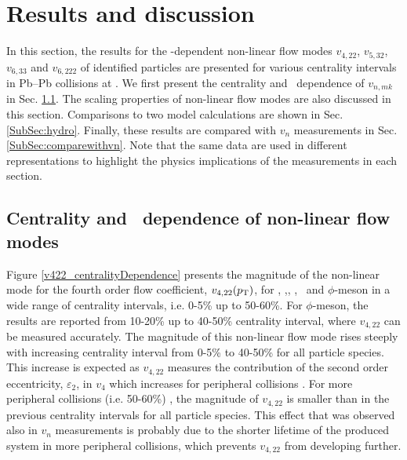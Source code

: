 \newpage

\section{Results and discussion}
\label{Sec:Results}

In this section, the results for the \pT-dependent non-linear flow modes $v_{4,22}$, $v_{5,32}$, $v_{6,33}$ and $v_{6,222}$ of identified particles are presented for various centrality intervals in Pb--Pb collisions at \sNN. We first present the centrality and \pT~dependence of $v_{n,mk}$ in Sec. \ref{SubSec:pTdependence}. The scaling properties of non-linear flow modes are also discussed in this section. Comparisons to two model calculations are shown in Sec. \ref{SubSec:hydro}. Finally, these results are compared with $v_{n}$ measurements in Sec. \ref{SubSec:comparewithvn}. Note that the same data are used in different representations to highlight the physics implications of the measurements in each section. 

\subsection{Centrality and \pT~dependence of non-linear flow modes}
\label{SubSec:pTdependence}

Figure \ref{v422_centralityDependence} presents the magnitude of the non-linear mode for the fourth order flow coefficient, $v_{4,22}(p_{\rm{T}})$, for \pion, \kaon,\Ks, \proton, \lambdas~and $\phi$-meson in a wide range of centrality intervals, i.e. 0-5\% up to 50-60\%. For $\phi$-meson, the results are reported from 10-20\% up to 40-50\% centrality interval, where $v_{4,22}$ can be measured accurately. The magnitude of this non-linear flow mode rises steeply with increasing centrality interval from 0-5\% to 40-50\% for all particle species. This increase is expected as $v_{4,22}$ measures the contribution of the second order eccentricity, $\varepsilon_{2}$, in $v_{4}$ which increases for peripheral collisions \cite{Alver:2010gr, Acharya:2017zfg}. For more peripheral collisions (i.e. 50-60\%) , the magnitude of $v_{4,22}$ is smaller than in the previous centrality intervals for all particle species. This effect that was observed also in $v_n$ measurements is probably due to the shorter lifetime of the produced system in more peripheral collisions, which prevents $v_{4,22}$ from developing further. 


